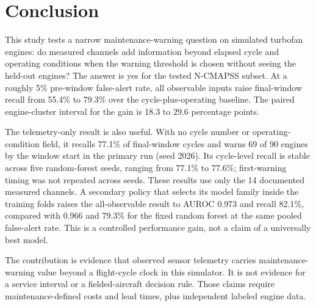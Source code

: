 \section{Conclusion}

This study tests a narrow maintenance-warning question on simulated turbofan
engines: do measured channels add information beyond elapsed cycle and operating
conditions when the warning threshold is chosen without seeing the held-out
engines? The answer is yes for the tested N-CMAPSS subset. At a roughly 5\%
pre-window false-alert rate, all observable inputs raise final-window recall
from 55.4\% to 79.3\% over the cycle-plus-operating baseline. The paired
engine-cluster interval for the gain is 18.3 to 29.6 percentage points.

The telemetry-only result is also useful. With no cycle number or
operating-condition field, it recalls 77.1\% of final-window cycles and warns
69 of 90 engines by the window start in the primary run (seed 2026). Its
cycle-level recall is stable across five random-forest seeds, ranging from
77.1\% to 77.6\%; first-warning timing was not repeated across seeds. These
results use only the 14 documented measured channels. A secondary policy that
selects its model family inside the training folds raises the all-observable
result to AUROC 0.973 and recall 82.1\%, compared with 0.966 and 79.3\% for the
fixed random forest at the same pooled false-alert rate. This is a controlled
performance gain, not a claim of a universally best model.

The contribution is evidence that observed sensor telemetry carries
maintenance-warning value beyond a flight-cycle clock in this simulator. It is
not evidence for a service interval or a fielded-aircraft decision rule. Those
claims require maintenance-defined costs and lead times, plus independent
labeled engine data.
